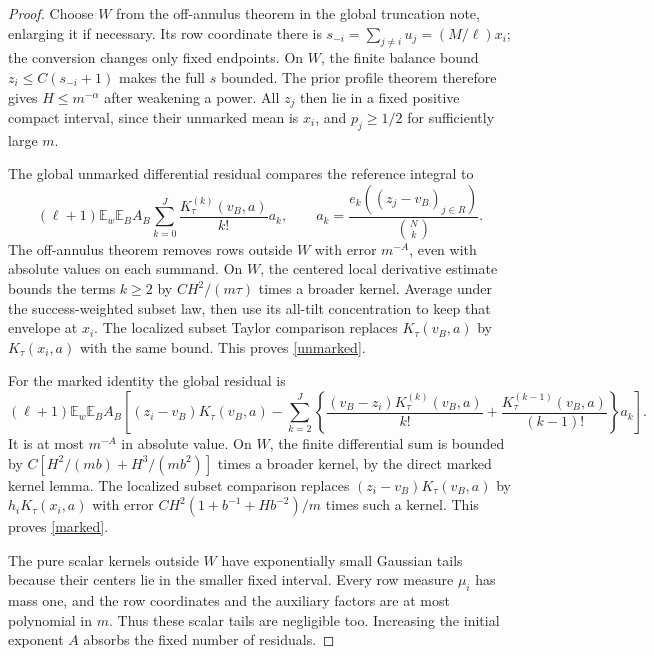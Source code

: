 \documentclass[11pt]{article}
\newcommand{\E}{\mathbb E}
\begin{document}
\begin{proof}
Choose $W$ from the off-annulus theorem in the global truncation
note, enlarging it if necessary. Its row coordinate there is
$s_{-i}=\sum_{j\ne i}u_j=(M/\ell)x_i$; the conversion changes only
fixed endpoints. On $W$, the finite balance bound
$z_i\le C(s_{-i}+1)$ makes the full $s$ bounded. The prior profile
theorem therefore gives $H\le m^{-\alpha}$ after weakening a power.
All $z_j$ then lie in a fixed positive compact interval, since their
unmarked mean is $x_i$, and $p_j\ge1/2$ for sufficiently large $m$.

The global unmarked differential residual compares the reference
integral to
\[
 (\ell+1)\E_w\E_B A_B
 \sum_{k=0}^J \frac{K_\tau^{(k)}(v_B,a)}{k!}a_k,
 \qquad
 a_k=\frac{e_k((z_j-v_B)_{j\in R})}{\binom Nk}.
\]
The off-annulus theorem removes rows outside $W$ with error
$m^{-A}$, even with absolute values on each summand. On $W$, the
centered local derivative estimate bounds the terms $k\ge2$ by
$CH^2/(m\tau)$ times a broader kernel. Average under the
success-weighted subset law, then use its all-tilt concentration to
keep that envelope at $x_i$. The localized subset Taylor comparison
replaces $K_\tau(v_B,a)$ by $K_\tau(x_i,a)$ with the same bound.
This proves \eqref{unmarked}.

For the marked identity the global residual is
\[
 (\ell+1)\E_w\E_B A_B\left[(z_i-v_B)K_\tau(v_B,a)
 -\sum_{k=2}^J\left\{
 \frac{(v_B-z_i)K_\tau^{(k)}(v_B,a)}{k!}
 +\frac{K_\tau^{(k-1)}(v_B,a)}{(k-1)!}\right\}a_k\right].
\]
It is at most $m^{-A}$ in absolute value. On $W$, the finite
differential sum is bounded by
$C[H^2/(mb)+H^3/(mb^2)]$ times a broader kernel, by the direct
marked kernel lemma. The localized subset comparison replaces
$(z_i-v_B)K_\tau(v_B,a)$ by $h_iK_\tau(x_i,a)$ with error
$CH^2(1+b^{-1}+Hb^{-2})/m$ times such a kernel. This proves
\eqref{marked}.

The pure scalar kernels outside $W$ have exponentially small
Gaussian tails because their centers lie in the smaller fixed
interval. Every row measure $\mu_i$ has mass one, and the row
coordinates and the auxiliary factors are at most polynomial in
$m$. Thus these scalar tails are negligible too. Increasing the
initial exponent $A$ absorbs the fixed number of residuals.
\end{proof}
\end{document}
